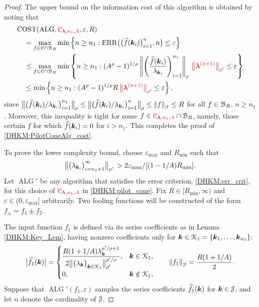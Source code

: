 \documentclass[USenglish]{article}
\theoremstyle{dgthm}
\theoremstyle{dgthm}
\theoremstyle{dgthm}
\theoremstyle{dgthm}
\theoremstyle{dgdef}
\theoremstyle{definition}
\DeclareMathOperator{\ALG}{ALG}
\DeclareMathOperator{\ERR}{ERR}
\newcommand{\dataN}{\bigl(\hf(\bsk_i)\bigr)_{i=1}^n}
\newcommand{\ERRN}{\ERR\bigl(\dataN,n\bigr)}
\DeclareMathOperator{\COST}{COST}
\newcommand{\hf}{\widehat{f}}
\newcommand{\bigabs}[1]{\ensuremath{\bigl \lvert #1 \bigr \rvert}}
\newcommand{\norm}[2][{}]{\ensuremath{\left \lVert #2 \right \rVert}_{#1}}
\newcommand{\bignorm}[2][{}]{\ensuremath{\bigl \lVert #2 \bigr \rVert}_{#1}}
\newcommand{\DHKMchange}[1]{{\color{red}{#1}}}
\begin{document}
\begin{proof} 
The upper bound on the information cost of this algorithm is obtained by noting that 
\begin{align*}
    \MoveEqLeft[1]{\COST(\ALG,\DHKMchange{\calC_{\boldsymbol{\lambda},n_1,A}},\varepsilon,R)} \\
    & = \max_{f \in \calC \cap \calB_{R}} \min \left \{n \ge n_1 : \ERRN \le \varepsilon \right \} \\
     & \le \max_{f \in \calC \cap \calB_{R}} \min \left \{n \ge n_1 : 
     (A^\rho -1)^{1/\rho} \norm[\rho]{\left( \frac{\hf(\bsk_i)}{\lambda_{\bsk_i}} \right)_{i=1}^{n_1}} \, 
     \DHKMchange{\bignorm[\rho']{\bslambda^{(n+1)}}}
    \le \varepsilon \right \} \\   
     & \le \min \left \{n \ge n_1 : 
     (A^\rho -1)^{1/\rho} R \, \DHKMchange{\bignorm[\rho']{\bslambda^{(n+1)}}}
    \le \varepsilon \right \},  
\end{align*}
since $\bignorm[\rho]{\bigl( \hf(\bsk_i)/\lambda_{\bsk_i} \bigr)_{i=1}^{n_1}} \le \bignorm[\rho]{\bigl( \hf(\bsk_i)/\lambda_{\bsk_i} \bigr)_{i=1}^{n}} \le  \norm[\calF]{f} \le R$ for all $f \in {\mathcal{B}}_R$, $n \ge n_1$.  Moreover, this inequality is tight for some $f \in \DHKMchange{\calC_{\boldsymbol{\lambda},n_1,A}} \cap \calB_{R}$, namely, those certain $f$ for which $\hf(\bsk_i) = 0$ for $i > n_1$.  This completes the proof of \eqref{DHKM:PilotConeAlg_cost}.

To prove the lower complexity bound, choose $\varepsilon_{\max}$ and $R_{\min}$ such that 
\[
\bignorm[\rho']{\bigl(  \lambda_{\bsk_i}  \bigr)_{i = n_1+1}^{\infty}} \,
    > 2\varepsilon_{\max}/[(1 - 1/A) R_{\min}].
    \]
Let $\ALG'$ be any algorithm that satisfies the error criterion, \eqref{DHKM:err_crit}, for this choice of $\DHKMchange{\calC_{\boldsymbol{\lambda},n_1,A}}$ in \eqref{DHKM:pilot_cone}.   Fix $R \in [R_{\min},\infty)$ and $\varepsilon \in (0,\varepsilon_{\max}]$ arbitrarily.  Two fooling functions will be constructed of the form $f_\pm = f_1 \pm f_2$.  

The input function $f_1$ is defined via its series coefficients as in Lemma \ref{DHKM:Key_Lem}, having nonzero coefficients only for ${\boldsymbol{k}} \in {\mathcal{K}}_1=\{{\boldsymbol{k}}_1, \ldots, {\boldsymbol{k}}_{n_1}\}$:
\begin{equation*}
    \bigabs{\hf_1(\bsk)} = \begin{cases} \displaystyle \frac{R (1+1/A) \lambda_{\bsk}^{\rho'/\rho + 1}}{2\bignorm[\rho']{\bigl(  \lambda_{\bsk}  \bigr)_{\bsk \in \calK_1}}^{\rho'/\rho}}, &  \bsk \in \calK_1, \\
    0, & \bsk \notin \calK_1,
    \end{cases}
   \qquad \norm[\calF]{f_1} = \frac{R(1 + 1/A)}{2}.
\end{equation*}
Suppose that $\ALG'(f_1,\varepsilon)$ samples the series coefficients $\hf_1(\bsk)$ for ${\boldsymbol{k}} \in {\mathcal{J}}$, and let $n$ denote the cardinality of ${\mathcal{J}}$.  


\end{proof}
\end{document}
